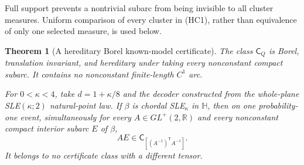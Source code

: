 \documentclass[11pt]{article}
\newtheorem{theorem}{Theorem}[section]
\theoremstyle{definition}\newtheorem{definition}[theorem]{Definition}
\theoremstyle{remark}\newtheorem{remark}[theorem]{Remark}
\begin{document}
Full support prevents a nontrivial subarc from being invisible to all
cluster measures. Uniform comparison of every cluster in (HC1), rather
than equivalence of only one selected measure, is used below.

\begin{theorem}[A hereditary Borel known-model certificate]
\label{thm:hereditary-cluster-certificate}
The class $\mathsf C_Q$ is Borel, translation invariant, and hereditary
under taking every nonconstant compact subarc. It contains no
nonconstant finite-length $C^1$ arc.

For $0<\kappa<4$, take $d=1+\kappa/8$ and the decoder constructed
from the whole-plane SLE$(\kappa;2)$ natural-point law. If $\beta$ is
chordal SLE$_\kappa$ in $\mathbb H$, then on one probability-one
event, simultaneously for every $A\in GL^+(2,\mathbb R)$ and every
nonconstant compact interior subarc $E$ of $\beta$,
\[
       AE\in\mathsf C_{[(A^{-1})^{\mathsf T}A^{-1}]}.
       \tag{HC3}
\]
It belongs to no certificate class with a different tensor.
\end{theorem}
\end{document}
